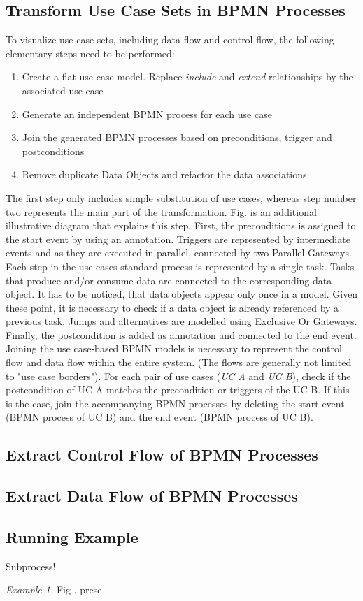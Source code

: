 \subsection{Transform Use Case Sets in BPMN Processes}
To visualize use case sets, including data flow and control flow, the following elementary steps need to be performed:

\begin{enumerate}
	\item Create a flat use case model. Replace \textit{include} and \textit{extend} relationships by the associated use case
	\item Generate an independent BPMN process for each use case
    \item Join the generated BPMN processes based on preconditions, trigger and postconditions
    \item Remove duplicate Data Objects and refactor the data associations
\end{enumerate}

The first step only includes simple substitution of use cases, whereas step number two represents the main part of the transformation. Fig. %
is an additional illustrative diagram that explains this step. First, the preconditions is assigned to the start event by using an annotation. Triggers are represented by intermediate events and as they are executed in parallel, connected by two Parallel Gateways. Each step in the use cases standard process is represented by a single task. Tasks that produce and/or consume data are connected to the corresponding data object. It has to be noticed, that data objects appear only once in a model. Given these point, it is necessary to check if a data object is already referenced by a previous task. Jumps and alternatives are modelled using Exclusive Or Gateways. Finally, the postcondition is added as annotation and connected to the end event. \\
Joining the use case-based BPMN models is necessary to represent the control flow and data flow within the entire system. (The flows are generally not limited to "use case borders"). For each pair of use cases (\textit{UC A} and \textit{UC B}), check if the postcondition of UC A matches the precondition or triggers of the UC B. If this is the case, join the accompanying BPMN processes by deleting the start event (BPMN process of UC B) and the end event (BPMN process of UC B).




\subsection{Extract Control Flow of BPMN Processes}

\subsection{Extract Data Flow of BPMN Processes}

\subsection{Running Example}


Subprocess!



\textit{Example 1.} Fig . prese








